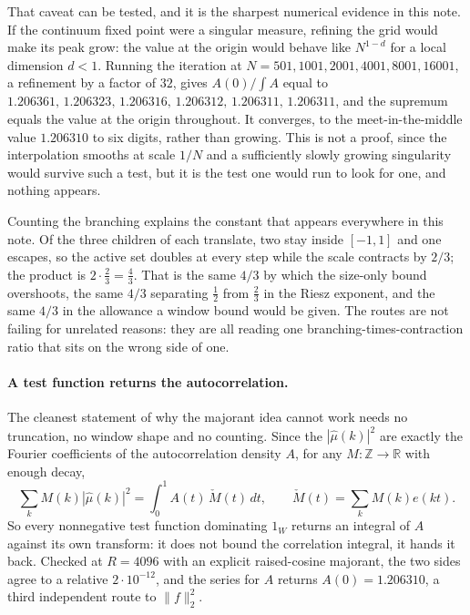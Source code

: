 \documentclass[11pt]{article}
\theoremstyle{remark}
\begin{document}
That caveat can be tested, and it is the sharpest numerical evidence in this note. If the continuum fixed
point were a singular measure, refining the grid would make its peak grow: the value at the origin would
behave like $N^{1-d}$ for a local dimension $d<1$. Running the iteration at $N=501,1001,2001,4001,8001,
16001$, a refinement by a factor of $32$, gives $A(0)/\!\int\!A$ equal to
$1.206361,\,1.206323,\,1.206316,\,1.206312,\,1.206311,\,1.206311$, and the supremum equals the value at the
origin throughout. It converges, to the meet-in-the-middle value $1.206310$ to six digits, rather than
growing. This is not a proof, since the interpolation smooths at scale $1/N$ and a sufficiently slowly
growing singularity would survive such a test, but it is the test one would run to look for one, and
nothing appears.

Counting the branching explains the constant that appears everywhere in this note. Of the three children
of each translate, two stay inside $[-1,1]$ and one escapes, so the active set doubles at every step while
the scale contracts by $2/3$; the product is $2\cdot\tfrac23=\tfrac43$. That is the same $4/3$ by which the
size-only bound overshoots, the same $4/3$ separating $\tfrac12$ from $\tfrac23$ in the Riesz exponent,
and the same $4/3$ in the allowance a window bound would be given. The routes are not failing for
unrelated reasons: they are all reading one branching-times-contraction ratio that sits on the wrong side
of one.

\paragraph{A test function returns the autocorrelation.} The cleanest statement of why the majorant
idea cannot work needs no truncation, no window shape and no counting. Since the $|\hat\mu(k)|^2$ are
exactly the Fourier coefficients of the autocorrelation density $A$, for any $M:\mathbb Z\to\mathbb R$
with enough decay,
\begin{equation}\label{eq:testfn}
  \sum_kM(k)|\hat\mu(k)|^2=\int_0^1A(t)\,\check M(t)\,dt,\qquad \check M(t)=\sum_kM(k)e(kt).
\end{equation}
So every nonnegative test function dominating $1_W$ returns an integral of $A$ against its own
transform: it does not bound the correlation integral, it hands it back. Checked at $R=4096$ with an
explicit raised-cosine majorant, the two sides agree to a relative $2\cdot10^{-12}$, and the series for
$A$ returns $A(0)=1.206310$, a third independent route to $\|f\|_2^2$.
\end{document}
